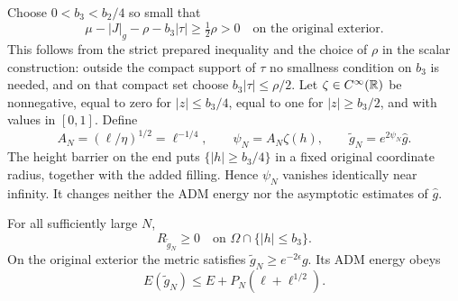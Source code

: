 Choose $0<b_3<b_2/4$ so small that
\begin{equation}\label{eq:height:strict-margin}
 \mu-|J|_g-\rho-b_3|\tau|\ge\tfrac12\rho>0
 \quad\text{on the original exterior}.
\end{equation}
This follows from the strict prepared inequality and the choice of
$\rho$ in the scalar construction: outside the compact support of
$\tau$ no smallness condition on $b_3$ is needed, and on that compact
set choose $b_3|\tau|\le\rho/2$.  Let $\zeta\in C^\infty(\mathbb R)$ be
nonnegative, equal to zero for $|z|\le b_3/4$, equal to one for
$|z|\ge b_3/2$, and with values in $[0,1]$.  Define
\begin{equation}\label{eq:height:plateau-metric}
 A_N=(\ell/\eta)^{1/2}=\ell^{-1/4},\qquad
 \psi_N= A_N\zeta(h),\qquad
 \widetilde g_N=e^{2\psi_N}\widehat g.
\end{equation}
The height barrier on the end puts $\{|h|\ge b_3/4\}$ in a fixed
original coordinate radius, together with the added filling.  Hence
$\psi_N$ vanishes identically near infinity.  It changes neither the
ADM energy nor the asymptotic estimates of $\widehat g$.

\begin{lemma}
\label{lem:height:curvature}
For all sufficiently large $N$,
\[
 R_{\widetilde g_N}\ge0
 \quad\text{on }\Omega\cap\{|h|\le b_3\}.
\]
On the original exterior the metric satisfies
$\widetilde g_N\ge e^{-2\epsilon}g$.  Its ADM energy obeys
\begin{equation}\label{eq:height:energy-upper}
 E(\widetilde g_N)\le E+P_N(\ell+\ell^{1/2}).
\end{equation}
\end{lemma}

